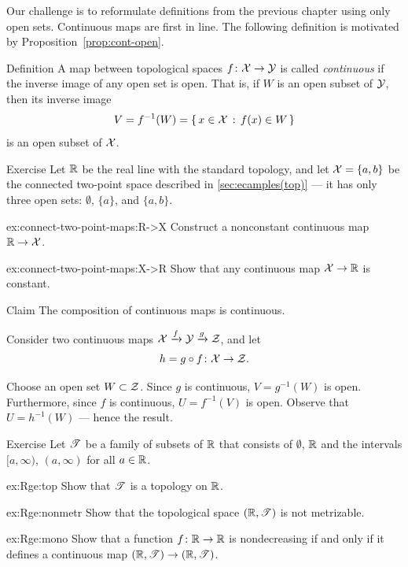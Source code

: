 Our challenge is to reformulate definitions from the previous chapter using only open sets.
Continuous maps are first in line.
The following definition is motivated by Proposition~\ref{prop:cont-open}.

\begin{thm}{Definition}\label{def:cont-top}
A map between topological spaces 
$f\colon\mathcal{X}\to\mathcal{Y}$ is called \emph{continuous} if the inverse image of any open set is open.
That is, if $W$ is an open subset of $\mathcal{Y}$, then its inverse image
\[V=f^{-1}(W)=\left\{\,{x\in \mathcal{X}}\,:\,{f(x)\in W}\,\right\}\]
is an open subset of $\mathcal{X}$.
\end{thm}

\begin{thm}{Exercise}\label{ex:connect-two-point-maps}
Let $\mathbb{R}$ be the real line with the standard topology,
and let $\mathcal{X}=\{a,b\}$ be the connected two-point space described in \ref{sec:ecamples(top)} --- it has only three open sets: $\emptyset$, $\{a\}$, and $\{a,b\}$.

\begin{subthm}{ex:connect-two-point-maps:R->X}
Construct a nonconstant continuous map $\mathbb{R}\to \mathcal{X}$.
\end{subthm}

\begin{subthm}{ex:connect-two-point-maps:X->R}
Show that any continuous map $\mathcal{X}\to \mathbb{R}$ is constant.
\end{subthm}

\end{thm}

\begin{thm}{Claim}\label{ex:composition-continuous}
The composition of continuous maps is continuous.
\end{thm}

Consider two continuous maps $\mathcal{X}\xrightarrow{f}\mathcal{Y}\xrightarrow{g}\mathcal{Z}$, and let
\[h=g\circ f\:\c{X}\z\to\c{Z}.\]

Choose an open set $W\subset \mathcal{Z}$.
Since $g$ is continuous, $V=g^{-1}(W)$ is open.
Furthermore, since $f$ is continuous, $U=f^{-1}(V)$ is open.
Observe that $U=h^{-1}(W)$ --- hence the result.
\qeds

\begin{thm}{Exercise}\label{ex:Rge}
Let $\mathscr{T}$ be a family of subsets of $\mathbb{R}$ that consists of $\emptyset$, $\mathbb{R}$ and the intervals $[a,\infty)$, $(a,\infty)$ for all $a\in\mathbb{R}$.

\begin{subthm}{ex:Rge:top}
Show that $\mathscr{T}$ is a topology on $\mathbb{R}$.
\end{subthm}

\begin{subthm}{ex:Rge:nonmetr}
Show that the topological space $(\mathbb{R},\mathscr{T})$ is not metrizable.
\end{subthm}

\begin{subthm}{ex:Rge:mono}
Show that a function $f\colon\mathbb{R}\to\mathbb{R}$ is nondecreasing if and only if it defines a continuous map $(\mathbb{R},\mathscr{T})\to (\mathbb{R},\mathscr{T})$.
\end{subthm}

\end{thm}

